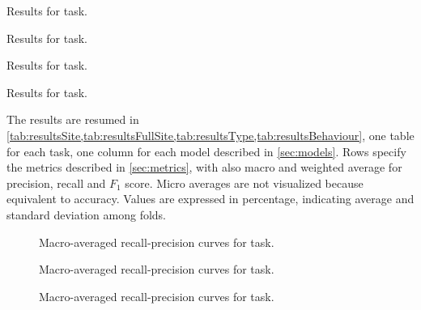 \begin{table}
  \centering
  \caption{Results for \site{} task.}
  \label{tab:resultsSite}
  \footnotesize
  
\end{table}

\begin{table}
  \centering
  \caption{Results for \fullSite{} task.}
  \label{tab:resultsFullSite}
  \footnotesize
  
\end{table}

\begin{table}
  \centering
  \caption{Results for \type{} task.}
  \label{tab:resultsType}
  \footnotesize
  
\end{table}

\begin{table}
  \centering
  \caption{Results for \behaviour{} task.}
  \label{tab:resultsBehaviour}
  \footnotesize
  
\end{table}

The results are resumed in
\cref{tab:resultsSite,tab:resultsFullSite,tab:resultsType,tab:resultsBehaviour},
one table for each task, one column for each 
model described in \cref{sec:models}. Rows specify the metrics
described in \cref{sec:metrics}, with also macro and weighted average
for precision, recall and $F_1$ score. Micro averages are not
visualized because equivalent to accuracy. Values are expressed in
percentage, indicating average and standard deviation among folds.

\begin{figure}
  \centering
  \resizebox{0.9\textwidth}{!}{}
  \caption{Macro-averaged recall-precision curves for \site{} task.}
  \label{fig:curvesSite}
\end{figure}

\begin{figure}
  \centering
  \resizebox{0.9\textwidth}{!}{}
  \caption{Macro-averaged recall-precision curves for \fullSite{} task.}
  \label{fig:curvesFullSite}
\end{figure}

\begin{figure}
  \centering
  \resizebox{0.9\textwidth}{!}{}
  \caption{Macro-averaged recall-precision curves for \type{} task.}
  \label{fig:curvesType}
\end{figure}

